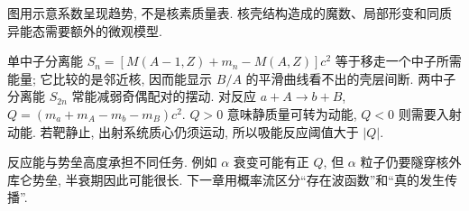\begin{center}
\end{center}
图用示意系数呈现趋势, 不是核素质量表. 核壳结构造成的魔数、局部形变和同质异能态需要额外的微观模型.

单中子分离能 $S_n=[M(A-1,Z)+m_n-M(A,Z)]c^2$ 等于移走一个中子所需能量; 它比较的是邻近核, 因而能显示 $B/A$ 的平滑曲线看不出的壳层间断. 两中子分离能 $S_{2n}$ 常能减弱奇偶配对的摆动. 对反应 $a+A\to b+B$, $Q=(m_a+m_A-m_b-m_B)c^2$. $Q>0$ 意味静质量可转为动能, $Q<0$ 则需要入射动能. 若靶静止, 出射系统质心仍须运动, 所以吸能反应阈值大于 $|Q|$.

反应能与势垒高度承担不同任务. 例如 $\alpha$ 衰变可能有正 $Q$, 但 $\alpha$ 粒子仍要隧穿核外库仑势垒, 半衰期因此可能很长. 下一章用概率流区分``存在波函数''和``真的发生传播''.
